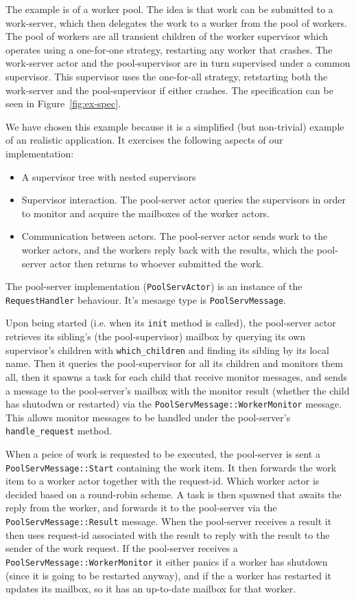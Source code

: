 \documentclass[a4paper]{article}
\newcommand\figref[1]{Figure~\ref{#1}}
\begin{document}
The example is of a worker pool. The idea is that work can be submitted to a
work-server, which then delegates the work to a worker from the pool of workers.
The pool of workers are all transient children of the worker supervisor which
operates using a one-for-one strategy, restarting any worker that crashes. The
work-server actor and the pool-supervisor are in turn supervised under a common
supervisor. This supervisor uses the one-for-all strategy, retstarting both the
work-server and the pool-supervisor if either crashes. The specification can be
seen in \figref{fig:ex-spec}.

We have chosen this example because it is a simplified (but non-trivial) example
of an realistic application. It exercises the following aspects of our
implementation:
\begin{itemize}
\item A supervisor tree with nested supervisors
\item Supervisor interaction. The pool-server actor queries the supervisors in order
  to monitor and acquire the mailboxes of the worker actors.
\item Communication between actors. The pool-server actor sends work to the
  worker actors, and the workers reply back with the results, which the
  pool-server actor then returns to whoever submitted the work.
\end{itemize}

The pool-server implementation (\texttt{PoolServActor}) is an instance of the
\texttt{RequestHandler} behaviour. It's mesasge type is
\texttt{PoolServMessage}.

Upon being started (i.e. when its \texttt{init} method
is called), the pool-server actor retrieves its sibling's (the pool-supervisor)
mailbox by querying its own supervisor's children with \texttt{which\_children}
and finding its sibling by its local name. Then it queries the pool-supervisor
for all its children and monitors them all, then it spawns a task for each child
that receive monitor messages, and sends a message to the pool-server's mailbox
with the monitor result (whether the child has shutodwn or restarted) via the
\texttt{{PoolServMessage::WorkerMonitor}} message. This allows monitor messages
to be handled under the pool-server's \texttt{handle\_request} method.

When a peice of work is requested to be executed, the pool-server is sent a
\texttt{PoolServMessage::Start} containing the work item. It then forwards the
work item to a worker actor together with the request-id. Which worker actor is
decided based on a round-robin scheme. A task is then spawned that awaits the
reply from the worker, and forwards it to the pool-server via the
\texttt{PoolServMessage::Result} message. When the pool-server receives a result
it then uses request-id associated with the result to reply with the result to
the sender of the work request. If the pool-server receives a
\texttt{PoolServMessage::WorkerMonitor} it either panics if a worker has
shutdown (since it is going to be restarted anyway), and if the a worker has
restarted it updates its mailbox, so it has an up-to-date mailbox for that
worker.
\end{document}

